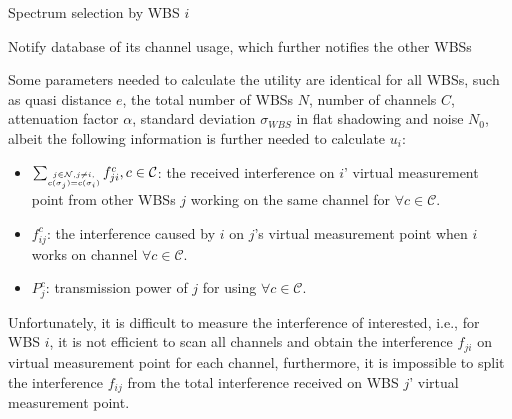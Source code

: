 \documentclass[times]{ettauth}
\newcommand{\ie}{i.e., }
\theoremstyle{mytheoremstyle}
\theoremstyle{mytheoremstyle}
\theoremstyle{mytheoremstyle}
\begin{document}
\begin{algorithm}[h]
\caption{Spectrum selection by WBS $i$}          %
\label{whitecatalgo} 
\DontPrintSemicolon
\SetAlgoLined
{}

	
Notify database of its channel usage, which further notifies the other WBSs

\end{algorithm}





Some parameters needed to calculate the utility are identical for all WBSs, such as quasi distance $e$, the total number of WBSs $N$, number of channels $C$, attenuation factor $\alpha$, standard deviation $\sigma_{WBS}$ in flat shadowing and noise $N_0$, albeit the following information is further needed to calculate $u_i$: 
	\begin{itemize} %
	\item $\sum_{\tiny\substack{j\in \mathcal{N}, j\ne i,\\ c(\sigma_j)=c(\sigma_i)}}f_{ji}^c, c\in \mathcal{C}$: the received interference on $i$' virtual measurement point from other WBSs $j$ working on the same channel for $\forall c\in \mathcal{C}$.
	\item $ f_{ij}^c$: the interference caused by $i$ on $j$'s virtual measurement point when $i$ works on channel $\forall c\in \mathcal{C}$.
	\item $P_j^c$: transmission power of $j$ for using $\forall c\in \mathcal{C}$.
	\end{itemize}
Unfortunately, it is difficult to measure the interference of interested, \ie for WBS $i$, it is not efficient to scan all channels and obtain the interference $f_{ji}$ on virtual measurement point for each channel, furthermore, it is impossible to split the interference $f_{ij}$ from the total interference received on WBS $j$' virtual measurement point. 
\end{document}
